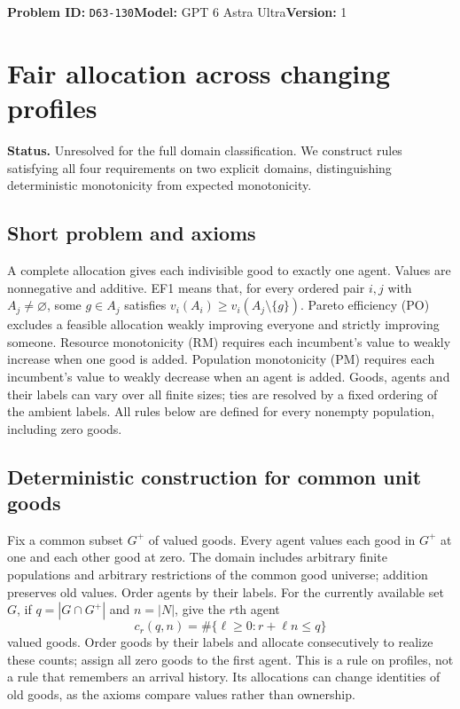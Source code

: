 \documentclass[11pt,a4paper]{article}
\begin{document}
\noindent\textbf{Problem ID:} \texttt{D63-130}\quad\textbf{Model:} GPT 6 Astra Ultra\quad\textbf{Version:} 1\par
\section*{Fair allocation across changing profiles}

\textbf{Status.} Unresolved for the full domain classification. We construct rules satisfying all four requirements on two explicit domains, distinguishing deterministic monotonicity from expected monotonicity.

\subsection*{Short problem and axioms}
A complete allocation gives each indivisible good to exactly one agent. Values are nonnegative and additive. EF1 means that, for every ordered pair $i,j$ with $A_j\ne\varnothing$, some $g\in A_j$ satisfies $v_i(A_i)\geq v_i(A_j\setminus\{g\})$. Pareto efficiency (PO) excludes a feasible allocation weakly improving everyone and strictly improving someone. Resource monotonicity (RM) requires each incumbent's value to weakly increase when one good is added. Population monotonicity (PM) requires each incumbent's value to weakly decrease when an agent is added. Goods, agents and their labels can vary over all finite sizes; ties are resolved by a fixed ordering of the ambient labels. All rules below are defined for every nonempty population, including zero goods.

\subsection*{Deterministic construction for common unit goods}
Fix a common subset $G^+$ of valued goods. Every agent values each good in $G^+$ at one and each other good at zero. The domain includes arbitrary finite populations and arbitrary restrictions of the common good universe; addition preserves old values. Order agents by their labels. For the currently available set $G$, if $q=|G\cap G^+|$ and $n=|N|$, give the $r$th agent
\[
 c_r(q,n)=\#\{\ell\geq0:r+\ell n\leq q\}
\]
valued goods. Order goods by their labels and allocate consecutively to realize these counts; assign all zero goods to the first agent. This is a rule on profiles, not a rule that remembers an arrival history. Its allocations can change identities of old goods, as the axioms compare values rather than ownership.
\end{document}
